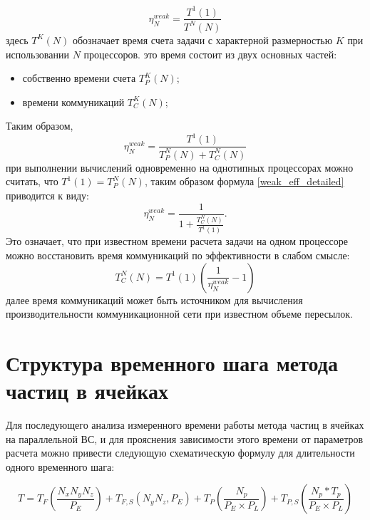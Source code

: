 			\begin{equation}
			\label{weak_eff}
			\eta^{weak}_N = \frac{T^1(1)}{T^N(N)}
			\end{equation}
			здесь $T^K(N)$ обозначает время счета задачи с характерной размерностью $K$ при использовании $N$ процессоров.
			это время состоит из двух основных частей:
			\begin{itemize}
				\item собственно времени счета $T^K_{P}(N)$;
				\item времени коммуникаций $T^K_C(N)$;
			\end{itemize}
			Таким образом,
			\begin{equation}
			\label{weak_eff_detailed}
			\eta^{weak}_N = \frac{T^1(1)}{T^N_{P}(N)+T^N_C(N)}
			\end{equation}
			при выполнении вычислений одновременно на однотипных процессорах
			можно считать, что $T^1(1) = T^N_{P}(N)$, таким образом формула
			\ref{weak_eff_detailed} приводится к виду:
			\begin{equation}
			\label{weak_eff_detailed-time}
			\eta^{weak}_N = \frac{1}{1+ \frac{T^N_{C}(N)}{T^1(1)}}.
			\end{equation}
			Это означает, что при известном времени расчета задачи на одном процессоре можно восстановить время коммуникаций по эффективности в слабом смысле:
			\begin{equation}
			\label{comm_time_from_efficiency}
			T^N_{C}(N) = T^1(1) \left(\frac{1}{\eta^{weak}_N} - 1\right)
			\end{equation}
			далее время коммуникаций может быть источником для вычисления производительности коммуникационной сети при известном объеме пересылок.
			
		\section{Структура временного шага метода частиц в ячейках}
		
		Для последующего анализа измеренного времени работы метода частиц в ячейках на параллельной ВС, и для прояснения зависимости этого времени от параметров расчета можно привести следующую схематическую формулу для длительности одного временного шага:
		
		\begin{equation}
		\label{PIC-timestep}
		T=T_{F} \left ( \frac{N_x N_y N_z }{P_E}\right )+ T_{F,S}\left (N_y N_z, P_E\right) + T_P\left(\frac{N_p}{P_E\times P_L}\right) +T_{P,S}\left (\frac{N_p*T_p}{P_E\times P_L}\right)
		\end{equation}
		
